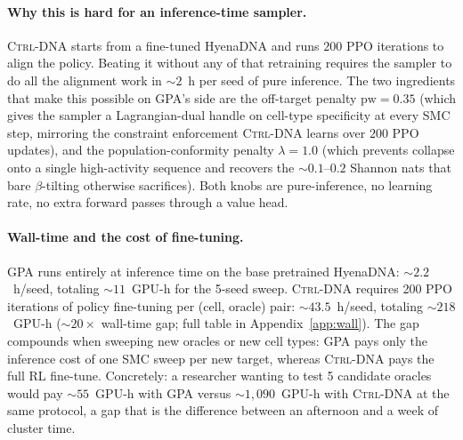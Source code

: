 \documentclass{article}
\theoremstyle{definition}
\theoremstyle{remark}
\newcommand{\gpa}{\textsc{GPA}\xspace}
\newcommand{\ctrldna}{\textsc{Ctrl-DNA}\xspace}
\begin{document}
\paragraph{Why this is hard for an inference-time sampler.}
\ctrldna{} starts from a fine-tuned HyenaDNA and runs $200$ PPO iterations to align the policy. Beating it without any of that retraining requires the sampler to do all the alignment work in $\sim\!2$~h per seed of pure inference. The two ingredients that make this possible on \gpa{}'s side are the off-target penalty $\mathrm{pw}\!=\!0.35$ (which gives the sampler a Lagrangian-dual handle on cell-type specificity at every SMC step, mirroring the constraint enforcement \ctrldna{} learns over $200$ PPO updates), and the population-conformity penalty $\lambda\!=\!1.0$ (which prevents collapse onto a single high-activity sequence and recovers the $\sim\!0.1$--$0.2$ Shannon nats that bare $\beta$-tilting otherwise sacrifices). Both knobs are pure-inference, no learning rate, no extra forward passes through a value head.

\paragraph{Wall-time and the cost of fine-tuning.}
\gpa{} runs entirely at inference time on the base pretrained HyenaDNA: $\sim\!2.2$~h/seed, totaling $\sim\!11$~GPU-h for the 5-seed sweep. \ctrldna{} requires 200 PPO iterations of policy fine-tuning per (cell, oracle) pair: $\sim\!43.5$~h/seed, totaling $\sim\!218$~GPU-h ($\sim\!20\!\times$ wall-time gap; full table in Appendix~\ref{app:wall}). The gap compounds when sweeping new oracles or new cell types: \gpa{} pays only the inference cost of one SMC sweep per new target, whereas \ctrldna{} pays the full RL fine-tune. Concretely: a researcher wanting to test 5 candidate oracles would pay $\sim\!55$~GPU-h with \gpa{} versus $\sim\!1{,}090$~GPU-h with \ctrldna{} at the same protocol, a gap that is the difference between an afternoon and a week of cluster time.
\end{document}
